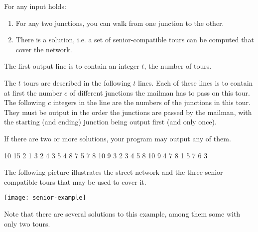 \documentclass{boi2014}
\begin{document}
    For any input holds:
    \begin{enumerate}
        \item For any two junctions, you can walk from one junction to the other.
        \item There is a solution, i.e. a set of senior-compatible tours can be
        computed that cover the network.
    \end{enumerate}

    \Output
    The first output line is to contain an integer $t$, the number of tours.

    The $t$ tours are described in the following $t$ lines. Each of these lines
    is to contain at first the number $c$ of different junctions the mailman has
    to pass on this tour. The following $c$ integers in the line are the numbers
    of the junctions in this tour. They must be output in the order the
    junctions are passed by the mailman, with the starting (and ending) junction
    being output first (and only once).

    If there are two or more solutions, your program may output any of them.

    \Example

    \renewcommand{\arraystretch}{1.5}
    {
        10 15  2  1 3  2 4  3 5  4 8  7  5 7  8  10  9
    }
    {
        3  2 3 4 5 8 10 9  4 7 8  1 5 7 6 3
    }
    {
        The following picture illustrates the street network and the three
        senior-compatible tours that may be used to cover it.

        \texttt{[image: senior-example]}

        Note that there are several solutions to this example, among them some
        with only two tours.
    
    }
\end{document}
